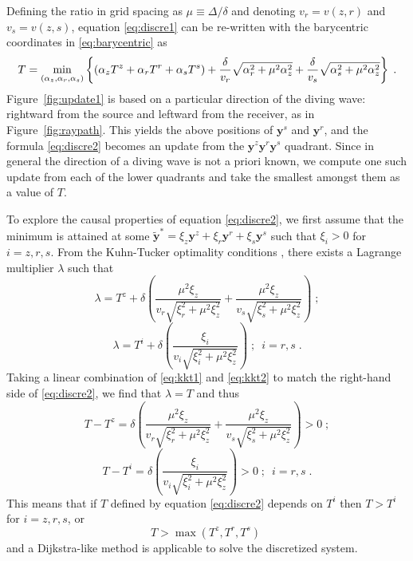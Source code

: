 Defining the ratio in grid spacing as $\mu \equiv \Delta / \delta$ and denoting $v_r = v (z,r)$ and 
$v_s = v (z,s)$, equation \ref{eq:discre1} can be re-written with the barycentric coordinates in 
\ref{eq:barycentric} as
\begin{equation}
\label{eq:discre2}
T = \smash{\displaystyle\min_{(\alpha_z,\alpha_r,\alpha_s)}}
\left\{ (\alpha_z T^z + \alpha_r T^r + \alpha_s T^s) 
+ \frac{\delta}{v_r} \sqrt{\alpha_r^2 + \mu^2 \alpha_z^2} 
+ \frac{\delta}{v_s} \sqrt{\alpha_s^2 + \mu^2 \alpha_z^2} \right\}\;.
\end{equation}
Figure~\ref{fig:update1} is based on a particular direction of the diving wave: rightward from the source and 
leftward from the receiver, as in Figure~\ref{fig:raypath}. This yields the above positions of $\mathbf{y}^s$ and 
$\mathbf{y}^r$, and the formula \ref{eq:discre2} becomes an update from the 
$\mathbf{y}^z \mathbf{y}^r \mathbf{y}^s$ quadrant. Since in general the direction of a diving wave is not a 
priori known, we compute one such update from each of the lower quadrants and take the smallest amongst them as a 
value of $T$. 

To explore the causal properties of equation \ref{eq:discre2}, we first assume that the minimum is attained at 
some $\mathbf{\tilde{y}}^* = \xi_z \mathbf{y}^z + \xi_r \mathbf{y}^r + \xi_s \mathbf{y}^s$ such that $\xi_i > 0$ 
for $i = z,r,s$. From the Kuhn-Tucker optimality conditions \cite[]{kuhn-tucker}, there exists a Lagrange 
multiplier $\lambda$ such that
\begin{equation}
\label{eq:kkt1}
\lambda = T^z + 
\delta \left( \frac{\mu^2 \xi_z}{v_r \sqrt{\xi_r^2 + \mu^2 \xi_z^2}} 
+ \frac{\mu^2 \xi_z}{v_s \sqrt{\xi_s^2 + \mu^2 \xi_z^2}} \right)\;;
\end{equation}
\begin{equation}
\label{eq:kkt2}
\lambda = T^i + 
\delta \left( \frac{\xi_i}{v_i \sqrt{\xi_i^2 + \mu^2 \xi_z^2}} \right)\;;\,\,\,i = r,s\;.
\end{equation}
Taking a linear combination of 
\ref{eq:kkt1} and \ref{eq:kkt2} to match the right-hand 
side of \ref{eq:discre2}, we find that $\lambda = T$ and thus 
\begin{equation}
\label{eq:kkt10}
T - T^z = 
\delta \left( \frac{\mu^2 \xi_z}{v_r \sqrt{\xi_r^2 + \mu^2 \xi_z^2}} 
+ \frac{\mu^2 \xi_z}{v_s \sqrt{\xi_s^2 + \mu^2 \xi_z^2}} \right) > 0\;;
\end{equation}
\begin{equation}
\label{eq:kkt20}
T - T^i = 
\delta \left( \frac{\xi_i}{v_i \sqrt{\xi_i^2 + \mu^2 \xi_z^2}} \right) > 0\;;\,\,\,i = r,s\;.
\end{equation}
This means that if $T$ defined by equation \ref{eq:discre2} depends on $T^i$ then $T > T^i$ 
for $i = z,r,s$, or
\begin{equation}
\label{eq:causality}
T > \max (T^z, T^r, T^s)\;
\end{equation}
and a Dijkstra-like method \cite[]{dijkstra} is applicable to solve the discretized system. 

